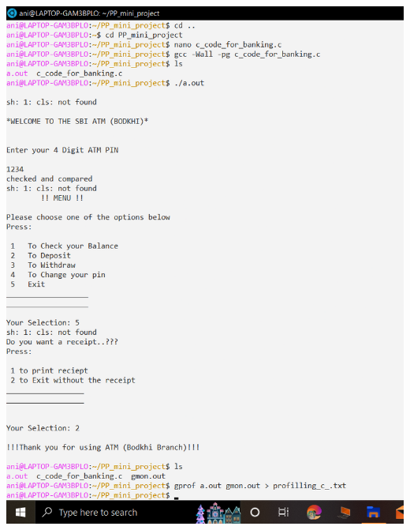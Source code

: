 \documentclass{article}
\begin{document}
\includegraphics[scale=0.35]{profilling1.png} \\ \\
\end{document}

